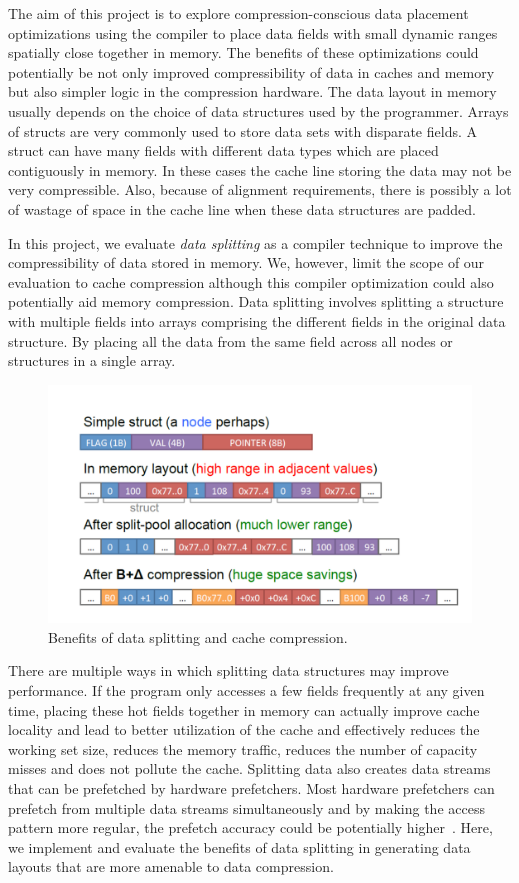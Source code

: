 The aim of this project is  to explore compression-conscious data placement
optimizations using the compiler to place data fields with small dynamic ranges
spatially close together in memory. The benefits of these optimizations could
potentially be not only improved compressibility of data in caches and memory
but also simpler logic in the compression hardware. The data layout in memory
usually depends on the choice of data structures used by the programmer. Arrays
of structs are very commonly used to store data sets with disparate fields. A
struct can have many fields with different data types which are placed
contiguously in memory. In these cases the cache line storing the data may not
be very compressible. Also, because of alignment requirements, there is possibly
a lot of wastage of space in the cache line when these data structures are
padded.  

In this project, we evaluate {\em data splitting}  as a compiler technique to
improve the compressibility of data stored in memory. We, however, limit the
scope of our evaluation to cache compression although this compiler optimization
could also potentially aid memory compression. Data splitting involves splitting
a structure with multiple fields into arrays comprising the different fields in
the original data structure. By placing all the data from the same field across
all nodes or structures in a single array.

\begin{figure}[htb]
\centering
\includegraphics[trim=0mm 0mm 0mm 0mm,clip,width=1\linewidth]{figs/pic1.pdf}
\caption{Benefits of data splitting and cache compression.}
\label{fig:benefit}
\end{figure}

There are multiple ways in which splitting data structures may improve
performance. If the program only accesses a few fields frequently at any given
time, placing these hot fields together in memory can actually improve cache
locality and lead to better utilization of the cache and effectively reduces the
working set size, reduces the memory traffic, reduces the number of capacity
misses and does not pollute the cache. Splitting data also creates data streams
that can be prefetched by hardware prefetchers. Most hardware prefetchers can
prefetch from multiple data streams simultaneously and by making the access
pattern more regular, the prefetch accuracy could be potentially higher~\cite{mpads}.
Here, we implement and evaluate the benefits of data splitting in generating
data layouts that are more amenable to data compression.

